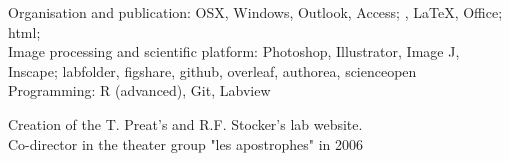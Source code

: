 %
%
%
%
%
%
%
%
%
%
%
%
%
%
Organisation and publication: OSX, Windows, Outlook, Access;
, \LaTeX, Office; html;\\
 Image processing and scientific platform: Photoshop, Illustrator, Image J, Inscape; 
 labfolder, figshare, github, overleaf, authorea, scienceopen
\\Programming:  R (advanced), Git, Labview

Creation of the T. Preat's and R.F. Stocker's lab website.
\\
Co-director in the theater group "les apostrophes" in
2006


